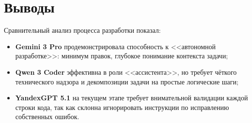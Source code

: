\section*{Выводы}
Сравнительный анализ процесса разработки показал:
\begin{itemize}
    \item \textbf{Gemini 3 Pro} продемонстрировала способность к <<автономной разработке>>: минимум правок, глубокое понимание контекста задачи;
    \item \textbf{Qwen 3 Coder} эффективна в роли <<ассистента>>, но требует чёткого технического надзора и декомпозиции задачи на простые логические шаги;
    \item \textbf{YandexGPT 5.1} на текущем этапе требует внимательной валидации каждой строки кода, так как склонна игнорировать инструкции по исправлению собственных ошибок.
\end{itemize}

\clearpage